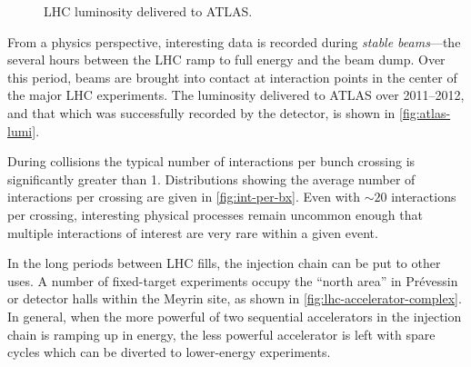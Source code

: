\begin{figure}
  \caption[LHC Luminosity Delivered to ATLAS]{%
    LHC luminosity delivered to ATLAS.}
\end{figure}

From a physics perspective, interesting data is recorded during \emph{stable beams}---the several hours between the LHC ramp to full energy and the beam dump.
Over this period, beams are brought into contact at interaction points in the center of the major LHC experiments.
The luminosity delivered to ATLAS over 2011--2012, and that which was successfully recorded by the detector, is shown in \cref{fig:atlas-lumi}.

During collisions the typical number of interactions per bunch crossing is significantly greater than 1. Distributions showing the average number of interactions per crossing are given in \cref{fig:int-per-bx}.
Even with $\sim 20$ interactions per crossing, interesting physical processes remain uncommon enough that multiple interactions of interest are very rare within a given event.


In the long periods between LHC fills, the injection chain can be put to other uses.
A number of fixed-target experiments occupy the ``north area'' in Pr\'evessin or detector halls within the Meyrin site, as shown in \cref{fig:lhc-accelerator-complex}.
In general, when the more powerful of two sequential accelerators in the injection chain is ramping up in energy, the less powerful accelerator is left with spare cycles which can be diverted to lower-energy experiments.
